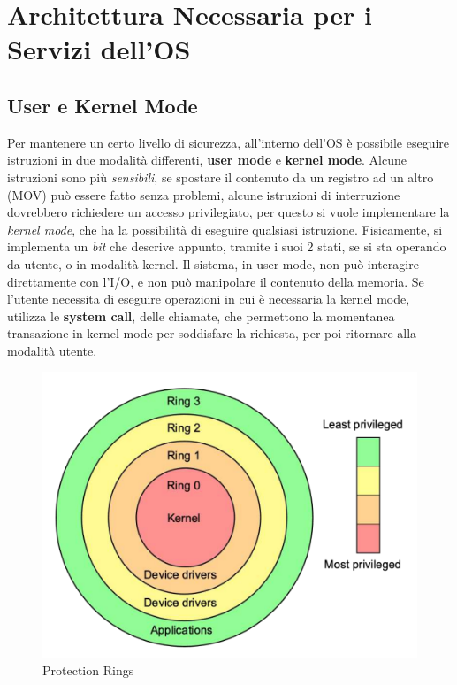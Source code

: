 \documentclass[12pt, letterpaper]{article}
\begin{document}
\section{Architettura Necessaria per i Servizi dell'OS}\subsection{User e Kernel Mode}\label{user kernel}
Per mantenere un certo livello di sicurezza, all'interno dell'OS è possibile eseguire istruzioni in due 
modalità differenti, \textbf{user mode} e \textbf{kernel mode}. Alcune istruzioni sono più
\textit{sensibili}, se spostare il contenuto da un registro ad un altro (MOV) può essere fatto senza 
problemi, alcune istruzioni di interruzione dovrebbero richiedere un accesso privilegiato, per questo 
si vuole implementare la \textit{kernel mode}, che ha la possibilità di eseguire qualsiasi istruzione.
Fisicamente, si implementa un \textit{bit} che descrive appunto, tramite i suoi 2 stati, se si sta 
operando da utente, o in modalità kernel. Il sistema, in user mode, non può interagire direttamente 
con l'I/O, e non può manipolare il contenuto della memoria. Se l'utente necessita di eseguire operazioni 
in cui è necessaria la kernel mode, utilizza le \textbf{system call}, delle chiamate, che permettono 
la momentanea transazione in kernel mode per soddisfare la richiesta, per poi ritornare alla modalità 
utente.
\begin{figure}
    \includegraphics[width=1\linewidth]{images/protectionRings.png} 
    \caption{Protection Rings}
    \label{fig:wrapfig}
    \end{figure}
\end{document}
